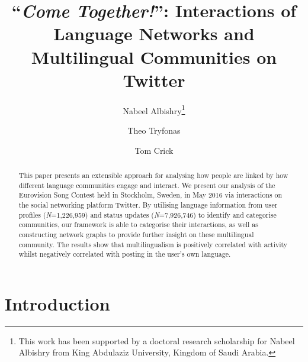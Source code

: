 \documentclass{llncs}
\begin{document}
\title{``{\emph{Come Together!}}'': Interactions of Language Networks and Multilingual Communities on Twitter}

\author{Nabeel Albishry\thanks{This work has been supported by a doctoral research scholarship for
Nabeel Albishry from King Abdulaziz University, Kingdom of Saudi
Arabia.} \and Theo Tryfonas \and Tom
  Crick}



\maketitle

\begin{abstract}
This paper presents an extensible approach for analysing how people
are linked by how different language communities engage and interact.
We present our analysis of the Eurovision Song Contest held in
Stockholm, Sweden, in May 2016 via interactions on the social
networking platform Twitter.  By utilising language information from
user profiles ({\emph{N}}=1,226,959) and status updates
({\emph{N}}=7,926,746) to identify and categorise communities, our
framework is able to categorise their interactions, as well as
constructing network graphs to provide further insight on these
multilingual community.  The results show that multilingualism is
positively correlated with activity whilst negatively correlated with
posting in the user's own language.
 \end{abstract}

\section{Introduction}\label{intro}
\end{document}
